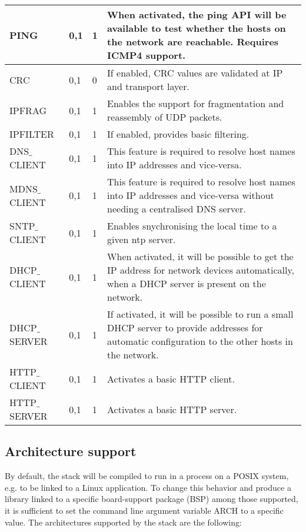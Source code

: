 \begin{longtable}{ | l | l | l | p{5cm} | }
PING&
0,1&
1&
When activated, the ping API will be available to test whether the hosts on the network are reachable.
Requires ICMP4 support.
\\ \hline

CRC&
0,1&
0&
If enabled, CRC values are validated at IP and transport layer.
\\ \hline

IPFRAG&
0,1&
1&
Enables the support for fragmentation and reassembly of UDP packets.
\\ \hline

IPFILTER&
0,1&
1&
If enabled, provides basic filtering.
\\ \hline

DNS$\_$CLIENT&
0,1&
1&
This feature is required to resolve host names into IP addresses and vice-versa.
\\ \hline

MDNS$\_$CLIENT&
0,1&
1&
This feature is required to resolve host names into IP addresses and vice-versa without needing a centralised DNS server.
\\ \hline

SNTP$\_$CLIENT&
0,1&
1&
Enables snychronising the local time to a given ntp server.
\\ \hline

DHCP$\_$CLIENT&
0,1&
1&
When activated, it will be possible to get the IP address for network devices automatically, when a DHCP
server is present on the network.
\\ \hline

DHCP$\_$SERVER&
0,1&
1&
If activated, it will be possible to run a small DHCP server to provide addresses for automatic configuration
to the other hosts in the network.
\\ \hline

HTTP$\_$CLIENT&
0,1&
1&
Activates a basic HTTP client.
\\ \hline

HTTP$\_$SERVER&
0,1&
1&
Activates a basic HTTP server.
\\ \hline

\end{longtable}

\subsection{Architecture support}
By default, the stack will be compiled to run in a process on a POSIX
system, e.g. to be linked to a Linux application. To change this behavior
and produce a library linked to a specific board-support package (BSP)
among those supported, it is sufficient to set the command line argument
variable ARCH to a specific value. The architectures supported by the stack
are the following:


